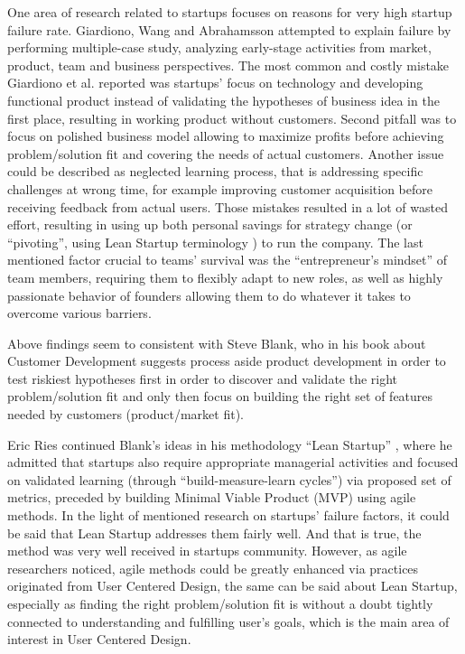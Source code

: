 \documentclass{article}
\begin{document}
One area of research related to startups focuses on reasons for very high startup failure rate. Giardiono, Wang and Abrahamsson \cite{giardino2014early} attempted to explain failure by performing multiple-case study, analyzing early-stage activities from market, product, team and business perspectives. The most common and costly mistake Giardiono et al. reported was startups' focus on technology and developing functional product instead of validating the hypotheses of business idea in the first place, resulting in working product without customers. Second pitfall was to focus on polished business model allowing to maximize profits before achieving problem/solution fit and covering the needs of actual customers. Another issue could be described as neglected learning process, that is addressing specific challenges at wrong time, for example improving customer acquisition before receiving feedback from actual users. Those mistakes resulted in a lot of wasted effort, resulting in using up both personal savings for strategy change (or ``pivoting'', using Lean Startup terminology \cite{ries2011lean}) to run the company. The last mentioned factor crucial to teams' survival was the ``entrepreneur's mindset'' of team members, requiring them to flexibly adapt to new roles, as well as highly passionate behavior of founders allowing them to do whatever it takes to overcome various barriers.

Above findings seem to consistent with Steve Blank, who in his book about Customer Development \cite{blank2013four} suggests process aside product development in order to test riskiest hypotheses first in order to discover and validate the right problem/solution fit and only then focus on building the right set of features needed by customers (product/market fit).

Eric Ries continued Blank's ideas in his methodology ``Lean Startup'' \cite{ries2011lean}, where he admitted that startups also require appropriate managerial activities and focused on validated learning (through ``build-measure-learn cycles'') via proposed set of metrics, preceded by building Minimal Viable Product (MVP) using agile methods. In the light of mentioned research on startups' failure factors, it could be said that Lean Startup addresses them fairly well. And that is true, the method was very well received in startups community. However, as agile researchers noticed, agile methods could be greatly enhanced via practices originated from User Centered Design, the same can be said about Lean Startup, especially as finding the right problem/solution fit is without a doubt tightly connected to understanding and fulfilling user's goals, which is the main area of interest in User Centered Design.
\end{document}
